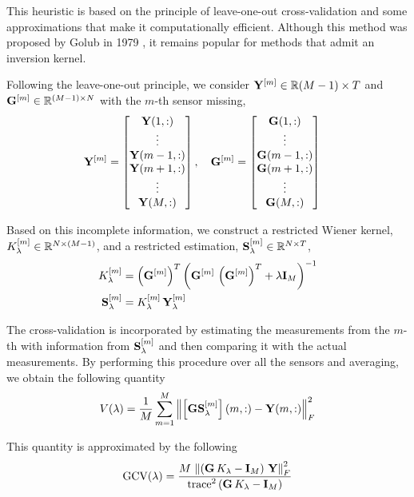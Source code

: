 This heuristic is based on the principle of leave-one-out cross-validation and some approximations that make it computationally efficient. 
%
Although this method was proposed by Golub in 1979 \cite{GCV_Golub}, it remains popular for methods that admit an inversion kernel.

Following the leave-one-out principle, we consider $\mathbf{Y}^{[m]}\in\mathbb{R}{(M-1)\times T}$ and $\mathbf{G}^{[m]} \in \mathbb{R}^{(M-1)\times N}$ with the $m$-th sensor missing,
\begin{align}
\mathbf{Y}^{[m]} &=
\begin{bmatrix}
\mathbf{Y}(1,:) \\
\vdots \\
\mathbf{Y}(m-1,:) \\
\mathbf{Y}(m+1,:) \\
\vdots \\
\mathbf{Y}(M,:) 
\end{bmatrix},
\quad
\mathbf{G}^{[m]} =
\begin{bmatrix}
\mathbf{G}(1,:) \\
\vdots \\
\mathbf{G}(m-1,:) \\
\mathbf{G}(m+1,:) \\
\vdots \\
\mathbf{G}(M,:) 
\end{bmatrix}
\end{align}

Based on this incomplete information, we construct a restricted Wiener kernel, $K_\lambda^{[m]} \in \mathbb{R}^{N\times(M-1)}$, and a restricted estimation, $\mathbf{S}_\lambda^{[m]} \in \mathbb{R}^{N\times T}$,
\begin{align}
K_\lambda^{[m]}
&=
\left( \mathbf{G}^{[m]} \right)^T\left(  \mathbf{G}^{[m]}\, \left( \mathbf{G}^{[m]} \right)^T + \lambda\mathbf{I}_M  \right)^{-1}
\\
\mathbf{S}_\lambda^{[m]}
&=
K_\lambda^{[m]}\, \mathbf{Y}_\lambda^{[m]}
\end{align}

The cross-validation is incorporated by estimating the measurements from the $m$-th with information from $\mathbf{S}_\lambda^{[m]}$ and then comparing it with the actual measurements.
%
By performing this procedure over all the sensors and averaging, we obtain the following quantity
\begin{equation}
V(\lambda) = 
\frac{1}{M}
\sum_{m=1}^M
\left\lVert  \left[  \mathbf{G} \mathbf{S}_\lambda^{[m]}  \right](m, :) - \mathbf{Y}(m,:)  \right\rVert_F^2
\label{det:GCV_pre}
\end{equation}

This quantity is approximated by the following
\begin{equation}
\text{GCV}(\lambda) = 
\frac{M\, \left\lVert \left( \mathbf{G}\, K_\lambda -\mathbf{I}_M  \right)\, \mathbf{Y} \right\rVert_F^2}{\text{trace}^2\left( \mathbf{G}\, K_\lambda - \mathbf{I}_M \right)}
\label{det:GCV}
\end{equation}

